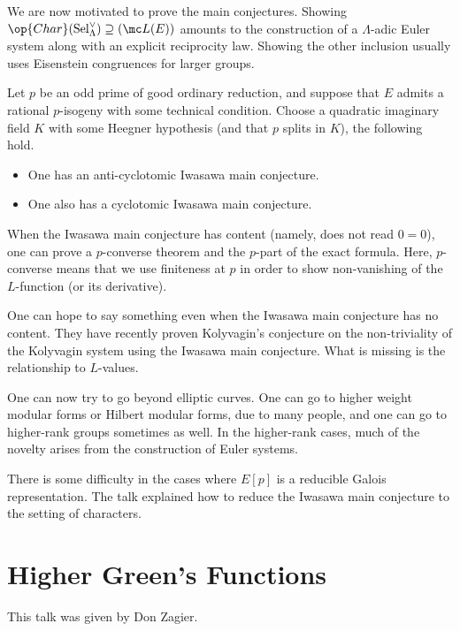 \documentclass{article}
\begin{document}
We are now motivated to prove the main conjectures. Showing $\op{Char}(\mathrm{Sel}_\Lambda^\lor)\supseteq(\mc L(E))$ amounts to the construction of a $\Lambda$-adic Euler system along with an explicit reciprocity law. Showing the other inclusion usually uses Eisenstein congruences for larger groups.
\begin{theorem}
	Let $p$ be an odd prime of good ordinary reduction, and suppose that $E$ admits a rational $p$-isogeny with some technical condition. Choose a quadratic imaginary field $K$ with some Heegner hypothesis (and that $p$ splits in $K$), the following hold.
	\begin{itemize}
		\item One has an anti-cyclotomic Iwasawa main conjecture.
		\item One also has a cyclotomic Iwasawa main conjecture.
	\end{itemize}
\end{theorem}
\begin{remark}
	When the Iwasawa main conjecture has content (namely, does not read $0=0$), one can prove a $p$-converse theorem and the $p$-part of the exact formula. Here, $p$-converse means that we use finiteness at $p$ in order to show non-vanishing of the $L$-function (or its derivative).
\end{remark}
\begin{remark}
	One can hope to say something even when the Iwasawa main conjecture has no content. They have recently proven Kolyvagin's conjecture on the non-triviality of the Kolyvagin system using the Iwasawa main conjecture. What is missing is the relationship to $L$-values.
\end{remark}
One can now try to go beyond elliptic curves. One can go to higher weight modular forms or Hilbert modular forms, due to many people, and one can go to higher-rank groups sometimes as well. In the higher-rank cases, much of the novelty arises from the construction of Euler systems.
\begin{remark}
	There is some difficulty in the cases where $E[p]$ is a reducible Galois representation. The talk explained how to reduce the Iwasawa main conjecture to the setting of characters.
\end{remark}

\section{Higher Green's Functions}
This talk was given by Don Zagier.
\end{document}
